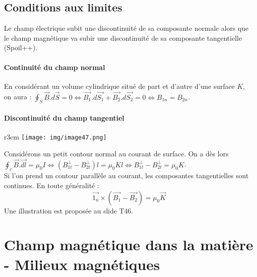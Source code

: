 \documentclass	[11pt, a4paper, openany]{book}
\begin{document}
\section{Conditions aux limites}\label{sec:conditions aux limites}
Le champ électrique subit une discontinuité de sa composante normale alors que le champ magnétique va subir une discontinuité de sa composante tangentielle (Spoil++).

\subsubsection*{Continuité du champ normal}
En considérant un volume cylindrique situé de part et d'autre d'une surface $K$, on aura : $\oint_S \vec{B}.d\vec{S} = 0 \Leftrightarrow \vec{B_1}.d\vec{S_1} + \vec{B_2}.d\vec{S_2} = 0 \Leftrightarrow B_{1n} = B_{2n}$.

\subsubsection*{Discontinuité du champ tangentiel}
\begin{wrapfigure}[9]{r}{3cm}
\texttt{[image: img/image47.png]}
\end{wrapfigure}
Considérons un petit contour normal au courant de surface. On a dès lors $\oint_c \vec{B}.\vec{dl} = \mu_0I \Leftrightarrow (B_{1t}^\perp - B_{2t}^\perp)l = \mu_0Kl \Leftrightarrow B_{1t}^\perp - B_{2t}^\perp = \mu_0K$.\\
Si l'on prend un contour parallèle au courant, les composantes tangentielles sont continues. En toute généralité :
\begin{equation}
\vec{1_n}\times (\vec{B_1} - \vec{B_2}) = \mu_0\vec K
\end{equation}
Une illustration est proposée au slide T46.


\chapter{Champ magnétique dans la matière - Milieux magnétiques}
\end{document}
